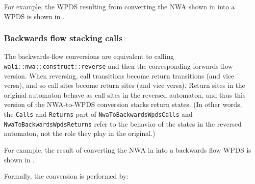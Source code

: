 For example, the WPDS resulting from converting the NWA
shown in  into a WPDS is shown in
. \\


\subsubsection{Backwards flow stacking calls}

The backwards-flow conversions are equivalent to calling
\texttt{wali::\-nwa::\-construct::\-reverse} and then the corresponding forwards
flow version. When reversing, call transitions become return transitions (and
vice versa), and so call sites become return sites (and vice versa).
Return sites in the original automaton behave as call sites in the reversed
automaton, and thus this version of the NWA-to-WPDS conversion stacks return
states. (In
other words, the \texttt{Calls} and \texttt{Returns} part of
\texttt{NwaTo\-Backwards\-WpdsCalls} and
\texttt{NwaTo\-Backwards\-WpdsReturns} refer to the behavior of the states in
the reversed automaton, not the role they play in the original.)

For example, the result of converting the NWA in
 into a backwards flow WPDS is shown in .


Formally, the conversion is performed by:



